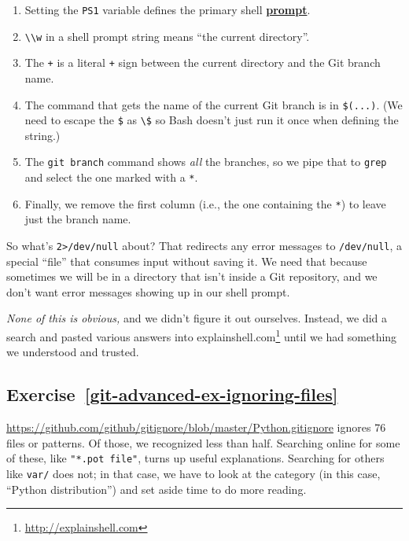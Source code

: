 \documentclass[
]{krantz}
\renewcommand{\href}[2]{#2\footnote{\url{#1}}}
\newcommand{\gref}[2]{\hyperlink{#2}{\textbf{#1}}}
\begin{document}
\begin{enumerate}
\def\labelenumi{\arabic{enumi}.}
\item
  Setting the \texttt{PS1} variable defines the primary shell \gref{prompt}{prompt}.
\item
  \texttt{\textbackslash{}\textbackslash{}w} in a shell prompt string means ``the current directory''.
\item
  The \texttt{+} is a literal \texttt{+} sign between the current directory and the Git branch name.
\item
  The command that gets the name of the current Git branch is in \texttt{\$(...)}.
  (We need to escape the \texttt{\$} as \texttt{\textbackslash{}\$} so Bash doesn't just run it once
  when defining the string.)
\item
  The \texttt{git\ branch} command shows \emph{all} the branches,
  so we pipe that to \texttt{grep} and select the one marked with a \texttt{*}.
\item
  Finally, we remove the first column (i.e., the one containing the \texttt{*})
  to leave just the branch name.
\end{enumerate}

So what's \texttt{2\textgreater{}/dev/null} about?
That redirects any error messages to \texttt{/dev/null},
a special ``file'' that consumes input without saving it.
We need that because sometimes we will be in a directory
that isn't inside a Git repository,
and we don't want error messages showing up in our shell prompt.

\emph{None of this is obvious,}
and we didn't figure it out ourselves.
Instead,
we did a search and pasted various answers into \href{http://explainshell.com}{explainshell.com}
until we had something we understood and trusted.

\hypertarget{exercise-refgit-advanced-ex-ignoring-files}{%
\subsection*{Exercise~\ref{git-advanced-ex-ignoring-files}}\label{exercise-refgit-advanced-ex-ignoring-files}}


\url{https://github.com/github/gitignore/blob/master/Python.gitignore}
ignores 76 files or patterns.
Of those,
we recognized less than half.
Searching online for some of these,
like \texttt{"*.pot\ file"},
turns up useful explanations.
Searching for others like \texttt{var/} does not;
in that case,
we have to look at the category (in this case, ``Python distribution'')
and set aside time to do more reading.
\end{document}
